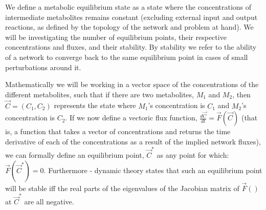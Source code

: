 \documentclass[a4page,notitlepage]{article}
\begin{document}
We define a metabolic equilibrium state as a state where the concentrations of intermediate metabolites remains constant (excluding external input and output reactions, as defined by the topology of the network and problem at hand).
We will be investigating the number of equilibrium points, their respective concentrations and fluxes, and their stability.
By stability we refer to the ability of a network to converge back to the same equilibrium point in cases of small perturbations around it.

Mathematically we will be working in a vector space of the concentrations of the different metabolites, such that if there are two metabolites, $M_1$ and $M_2$, then $\vec{C}=(C_1,C_2)$ represents the state where $M_1$'s concentration is $C_1$ and $M_2$'s concentration is $C_2$.
If we now define a vectoric flux function, $\frac{d\vec{C}}{dt}=\vec{F}(\vec{C})$ (that is, a function that takes a vector of concentrations and returns the time derivative of each of the concentrations as a result of the implied network fluxes), we can formally define an equilibrium point, $\vec{C}^*$ as any point for which: $\vec{F}(\vec{C}^*)=0$.
Furthermore - dynamic theory states that such an equilibrium point will be stable iff the real parts of the eigenvalues of the Jacobian matrix of $\vec{F}()$ at $\vec{C}^*$ are all negative.
\end{document}
